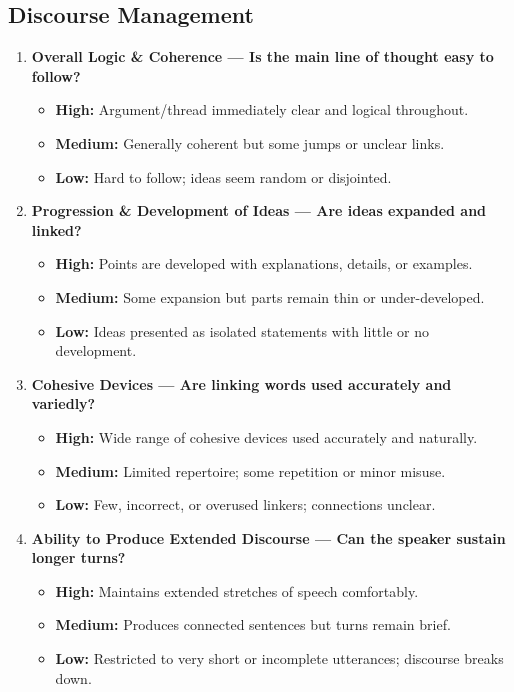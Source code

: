 \documentclass{report}
\begin{document}
\subsection*{Discourse Management}
\begin{enumerate}
  \item \textbf{Overall Logic \& Coherence — Is the main line of thought easy to follow?}
  \begin{itemize}
    \item \textbf{High:} Argument/thread immediately clear and logical throughout.
    \item \textbf{Medium:} Generally coherent but some jumps or unclear links.
    \item \textbf{Low:} Hard to follow; ideas seem random or disjointed.
  \end{itemize}

  \item \textbf{Progression \& Development of Ideas — Are ideas expanded and linked?}
  \begin{itemize}
    \item \textbf{High:} Points are developed with explanations, details, or examples.
    \item \textbf{Medium:} Some expansion but parts remain thin or under-developed.
    \item \textbf{Low:} Ideas presented as isolated statements with little or no development.
  \end{itemize}

  \item \textbf{Cohesive Devices — Are linking words used accurately and variedly?}
  \begin{itemize}
    \item \textbf{High:} Wide range of cohesive devices used accurately and naturally.
    \item \textbf{Medium:} Limited repertoire; some repetition or minor misuse.
    \item \textbf{Low:} Few, incorrect, or overused linkers; connections unclear.
  \end{itemize}

  \item \textbf{Ability to Produce Extended Discourse — Can the speaker sustain longer turns?}
  \begin{itemize}
    \item \textbf{High:} Maintains extended stretches of speech comfortably.
    \item \textbf{Medium:} Produces connected sentences but turns remain brief.
    \item \textbf{Low:} Restricted to very short or incomplete utterances; discourse breaks down.
  \end{itemize}
\end{enumerate}
\end{document}

